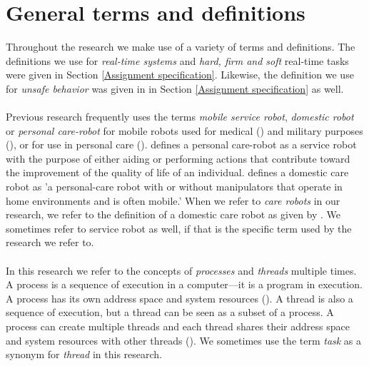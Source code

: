 \documentclass[12pt]{scrreprt}
\begin{document}
\section{General terms and definitions}
\label{Terms and defintions}
Throughout the research we make use of a variety of terms and definitions. The definitions we use for \textit{real-time systems} and \textit{hard, firm and soft} real-time tasks were given in Section \ref{Assignment specification}. Likewise, the definition we use for \textit{unsafe behavior} was given in in Section \ref{Assignment specification} as well.%
\\\\
Previous research frequently uses the terms \textit{mobile service robot}, \textit{domestic robot} or \textit{personal care-robot} for mobile robots used for medical (\cite{medical}) and military purposes (\cite{military}), or for use in personal care (\cite{personal}). \cite{tadele} defines a personal care-robot as a service robot with the purpose of either aiding or performing actions that contribute toward the improvement of the quality of life of an individual. \cite{tadele} defines a domestic care robot as 'a personal-care robot with or without manipulators that operate in home environments and is often mobile.' When we refer to \textit{care robots} in our research, we refer to the definition of a domestic care robot as given by \citeauthor{tadele}. We sometimes refer to service robot as well, if that is the specific term used by the research we refer to.
\\\\
In this research we refer to the concepts of \textit{processes} and \textit{threads} multiple times. A process is a sequence of execution in a computer---it is a program in execution. A process has its own address space and system resources (\cite{process_threads}). A thread is also a sequence of execution, but a thread can be seen as a subset of a process. A process can create multiple threads and each thread shares their address space and system resources with other threads (\cite{process_threads}). We sometimes use the term \textit{task} as a synonym for \textit{thread} in this research.
\end{document}

